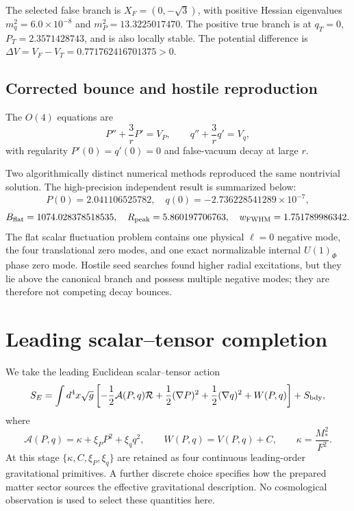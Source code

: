 \documentclass[11pt]{article}
\begin{document}
The selected false branch is $X_F=(0,-\sqrt 3)$, with positive Hessian eigenvalues $m_q^2=6.0\times10^{-8}$ and $m_P^2=13.3225017470$. The positive true branch is at $q_T=0$, $P_T=2.3571428743$, and is also locally stable. The potential difference is $\Delta V=V_F-V_T=0.771762416701375>0$.

\subsection{Corrected bounce and hostile reproduction}

The $O(4)$ equations are
\begin{equation}
P''+\frac3rP'=V_P,\qquad q''+\frac3rq'=V_q,
\end{equation}
with regularity $P'(0)=q'(0)=0$ and false-vacuum decay at large $r$.

Two algorithmically distinct numerical methods reproduced the same nontrivial solution. The high-precision independent result is summarized below:
\begin{equation}
P(0)=2.041106525782,\quad q(0)=-2.736228541289\times10^{-7},
\end{equation}
\begin{equation}
B_{\rm flat}=1074.028378518535,\quad R_{\rm peak}=5.860197706763,\quad w_{\rm FWHM}=1.751789986342.
\end{equation}
The flat scalar fluctuation problem contains one physical $\ell=0$ negative mode, the four translational zero modes, and one exact normalizable internal $U(1)_\Phi$ phase zero mode. Hostile seed searches found higher radial excitations, but they lie above the canonical branch and possess multiple negative modes; they are therefore not competing decay bounces.

\section{Leading scalar--tensor completion}

We take the leading Euclidean scalar--tensor action
\begin{equation}
S_E=\int d^4x\sqrt g\left[-\frac12\mathcal A(P,q)\mathcal R+\frac12(\nabla P)^2+\frac12(\nabla q)^2+W(P,q)\right]+S_{\rm bdy},
\end{equation}
where
\begin{equation}
\mathcal A(P,q)=\kappa+\xi_P P^2+\xi_q q^2,\qquad W(P,q)=V(P,q)+C,\qquad \kappa=\frac{M_*^2}{F^2}.
\end{equation}
At this stage $\{\kappa,C,\xi_P,\xi_q\}$ are retained as four continuous leading-order gravitational primitives. A further discrete choice specifies how the prepared matter sector sources the effective gravitational description. No cosmological observation is used to select these quantities here.
\end{document}
